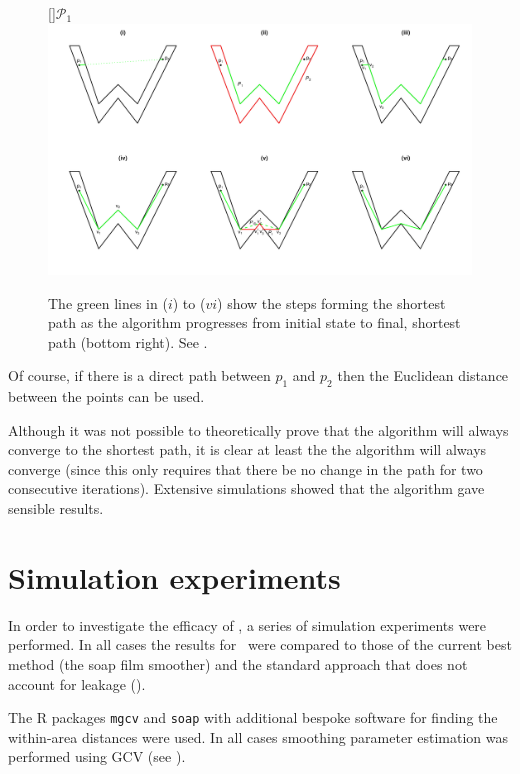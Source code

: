 \begin{figure}
\centering
[]{$\mathcal{P}_1$}
\includegraphics[trim=0in 0.5in 0in 0.25in, width=9.5in]{mds/figs/wdia.pdf} \\
\caption{The green lines in ($i$) to ($vi$) show the steps forming the shortest path as the algorithm progresses from initial state to final, shortest path (bottom right). See .}
\label{wdia}
\end{figure}

Of course, if there is a direct path between $p_1$ and $p_2$ then the Euclidean distance between the points can be used.

Although it was not possible to theoretically prove that the algorithm will always converge to the shortest path, it is clear at least the the algorithm will always converge (since this only requires that there be no change in the path for two consecutive iterations). Extensive simulations showed that the algorithm gave sensible results.

\section{Simulation experiments}
\label{mdssims}

In order to investigate the efficacy of \mdsap, a series of simulation experiments were performed. In all cases the results for \mdsap\ were compared to those of the current best method (the soap film smoother) and the standard approach that does not account for leakage (\tprs).

The \textsf{R} packages \texttt{mgcv} and \texttt{soap} with additional bespoke software for finding the within-area distances were used. In all cases smoothing parameter estimation was performed using GCV (see ).

